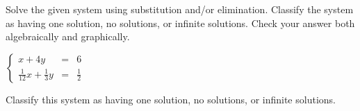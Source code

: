 \documentclass{ximera}
\author{Elizabeth Miller}
\begin{document}
Solve the given system using substitution and/or elimination. Classify the system as having one solution, no solutions, or infinite solutions. Check your answer both algebraically and graphically.

$\left\{ \begin{array}{rcr} x+4y & = & 6 \\ \frac{1}{12}x+\frac{1}{3}y& = & \frac{1}{2}  \end{array} \right.$ 

\begin{exercise}
Classify this system as having one solution, no solutions, or infinite solutions.
\begin{multipleChoice}  
\end{multipleChoice}  
\end{exercise}
\end{document}
